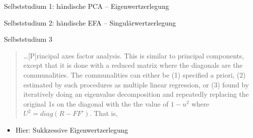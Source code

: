 \documentclass[
  ignorenonframetext,
]{beamer}
\providecommand{\tightlist}{%
  \setlength{\itemsep}{0pt}\setlength{\parskip}{0pt}}
\begin{document}
\begin{frame}{Selbststudium 1: händische PCA -- Eigenwertzerlegung}
\protect\hypertarget{selbststudium-1-huxe4ndische-pca-eigenwertzerlegung}{}
\end{frame}

\begin{frame}{Selbststudium 2: händische EFA -- Singulärwertzerlegung}
\protect\hypertarget{selbststudium-2-huxe4ndische-efa-singuluxe4rwertzerlegung}{}
\end{frame}

\begin{frame}{Selbststudium 3}
\protect\hypertarget{selbststudium-3}{}
\begin{quote}
\ldots{[}P{]}rincipal axes factor analysis. This is similar to principal
components, except that it is done with a reduced matrix where the
diagonals are the communalities. The communalities can either be (1)
specified a priori, (2) estimated by such procedures as multiple linear
regression, or (3) found by iteratively doing an eigenvalue
decomposition and repeatedly replacing the original 1s on the diagonal
with the the value of \(1 - u^2\) where \(U^2 = diag(R−FF')\). That is,
\end{quote}

\begin{itemize}
\tightlist
\item
  Hier: Sukkzessive Eigenwertzerlegung
\end{itemize}
\end{frame}
\end{document}
